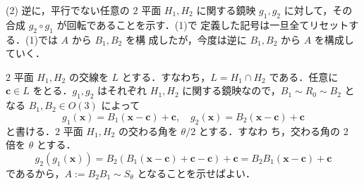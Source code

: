 \documentclass[11pt, uplatex, dvipdfmx, titlepage]{jsarticle}
\makeatletter
\DeclareMathOperator{\Inv}{Inv}
\renewenvironment{proof}[1][\proofname]{\par
  \pushQED{\qed}%
  \normalfont \topsep6\p@\@plus6\p@\relax
  \trivlist
  \item[\hskip\labelsep
         \bfseries
    {#1}]\ignorespaces
}{%
  \popQED\endtrivlist\@endpefalse
}
\theoremstyle{definition}
\renewcommand{\proofname}{\textbf{証明}}
\makeatother
\begin{document}
\begin{proof}

  \noindent
  (2) 逆に，平行でない任意の $2$ 平面 $H_1, H_2$ に関する鏡映 $g_1,
  g_2$ に対して，その合成 $g_2 \circ g_1$ が回転であることを示す．(1)で
  定義した記号は一旦全てリセットする．(1)では $A$ から $B_1, B_2$ を構
  成したが，今度は逆に $B_1, B_2$ から $A$ を構成していく．

  $2$ 平面 $H_1, H_2$ の交線を $L$ とする．すなわち，$L=H_1 \cap H_2$
  である．任意に $\bm{c} \in L$ をとる．$g_1, g_2$ はそれぞれ $H_1,
  H_2$ に関する鏡映なので，$B_1 \sim R_0 \sim B_2$ となる $B_1 , B_2
  \in O(3)$ によって
  \[
    g_1(\bm{x}) = B_1 (\bm{x}-\bm{c})+\bm{c}, \quad g_2(\bm{x}) =
    B_2(\bm{x}-\bm{c})+\bm{c}
  \]
  と書ける．$2$ 平面 $H_1, H_2$ の交わる角を $\theta/2$ とする．すなわ
  ち，交わる角の $2$ 倍を $\theta$ とする．
  \[
    g_2 ( g_1(\bm{x})) = B_2\left(B_1(\bm{x}-\bm{c})+\bm{c} - \bm{c}\right) + \bm{c} 
    = B_2 B_1(\bm{x}-\bm{c})+\bm{c}
  \]
  であるから，$A:=B_2 B_1 \sim S_{\theta}$ となることを示せばよい．


\end{proof}
\end{document}
